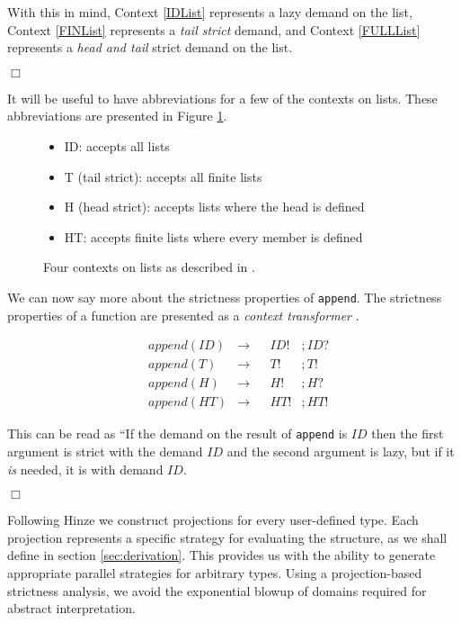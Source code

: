 \documentclass[preprint]{sigplanconf}
\begin{document}
With this in mind, Context \ref{IDList} represents a lazy demand on the list,
Context \ref{FINList} represents a \emph{tail strict} demand, and Context
\ref{FULLList} represents a \emph{head and tail} strict demand on the list.

\hfill$\Box$

It will be useful to have abbreviations for a few of the contexts on lists. These
abbreviations are presented in Figure \ref{fig:listContexts}.

\begin{figure}[h!]
\begin{itemize}
    \item[] \<ID\>: accepts all lists
    \item[] \<T\> (tail strict): accepts all finite lists
    \item[] \<H\> (head strict): accepts lists where the head is defined
    \item[] \<HT\>: accepts finite lists where every member is defined
\end{itemize}
\caption[Projections for the 4-point Domain]{Four contexts on lists as described in \citep{wadler1987projections}.}
\label{fig:listContexts}
\end{figure}

We can now say more about the strictness properties of \verb'append'. The
strictness properties of a function are presented as a \emph{context
transformer} \citep{hinze1995projection}. 

\begin{align*}
    &append(ID) &\rightarrow &&ID!&;ID? \\
    &append(T)  &\rightarrow &&T!&;T! \\
    &append(H)  &\rightarrow &&H!&;H? \\
    &append(HT) &\rightarrow &&HT!&;HT!
\end{align*}

This can be read as ``If the demand on the result of \verb-append- is $ID$
then the first argument is strict with the demand $ID$ and the second
argument is lazy, but if it \emph{is} needed, it is with demand $ID$.

\hfill$\Box$

Following Hinze \citep{hinze1995projection} we construct projections
for every user-defined type. Each projection represents a
specific strategy for evaluating the structure, as we shall define in section
\ref{sec:derivation}. This provides us with the ability to generate
appropriate parallel strategies for arbitrary types. Using a
projection-based strictness analysis, we avoid the exponential blowup
of domains required for abstract interpretation.
\end{document}
